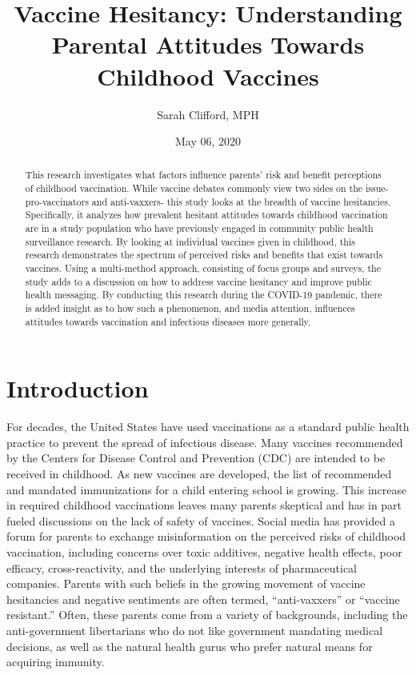 \documentclass[12pt,]{article}
\title{Vaccine Hesitancy: Understanding Parental Attitudes Towards Childhood Vaccines}
\author{Sarah Clifford, MPH}
\date{May 06, 2020}
\begin{document}
\maketitle
\begin{abstract}
This research investigates what factors influence parents' risk and benefit perceptions of childhood vaccination. While vaccine debates commonly view two sides on the issue- pro-vaccinators and anti-vaxxers- this study looks at the breadth of vaccine hesitancies. Specifically, it analyzes how prevalent hesitant attitudes towards childhood vaccination are in a study population who have previously engaged in community public health surveillance research. By looking at individual vaccines given in childhood, this research demonstrates the spectrum of perceived risks and benefits that exist towards vaccines. Using a multi-method approach, consisting of focus groups and surveys, the study adds to a discussion on how to address vaccine hesitancy and improve public health messaging. By conducting this research during the COVID-19 pandemic, there is added insight as to how such a phenomenon, and media attention, influences attitudes towards vaccination and infectious diseases more generally.
\end{abstract}

{
\hypersetup{linkcolor=}
\setcounter{tocdepth}{2}
\tableofcontents
}
\hypertarget{introduction}{%
\section{Introduction}\label{introduction}}

For decades, the United States have used vaccinations as a standard public health practice to prevent the spread of infectious disease. Many vaccines recommended by the Centers for Disease Control and Prevention (CDC) are intended to be received in childhood. As new vaccines are developed, the list of recommended and mandated immunizations for a child entering school is growing. This increase in required childhood vaccinations leaves many parents skeptical and has in part fueled discussions on the lack of safety of vaccines. Social media has provided a forum for parents to exchange misinformation on the perceived risks of childhood vaccination, including concerns over toxic additives, negative health effects, poor efficacy, cross-reactivity, and the underlying interests of pharmaceutical companies. Parents with such beliefs in the growing movement of vaccine hesitancies and negative sentiments are often termed, ``anti-vaxxers'' or ``vaccine resistant.'' Often, these parents come from a variety of backgrounds, including the anti-government libertarians who do not like government mandating medical decisions, as well as the natural health gurus who prefer natural means for acquiring immunity.
\end{document}
